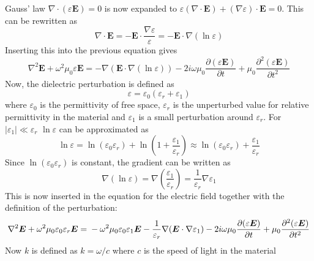 \documentclass[10pt,a4paper]{eitExjobb}
\begin{document}
	Gauss' law $\nabla \cdot (\varepsilon \bm{E}) = 0$ is now expanded to $\varepsilon(\nabla \cdot \bm{E}) + (\nabla \varepsilon) \cdot \bm{E} = 0$. This can be rewritten as
	\begin{equation*}
	\nabla \cdot \bm{E} = -\bm{E} \cdot \frac{\nabla \varepsilon}{\varepsilon} = -\bm{E} \cdot \nabla (\ln{\varepsilon})
	\end{equation*}
	Inserting this into the previous equation gives
	\begin{equation*}
	\nabla^2\bm{E} + \omega^2 \mu_0 \varepsilon \bm{E} = -\nabla(\bm{E} \cdot \nabla (\ln{\varepsilon})) - 2i\omega \mu_0 \frac{\partial (\varepsilon \bm{E})}{\partial t} + \mu_0 \frac{\partial^2 (\varepsilon \bm{E})}{\partial t^2}
	\end{equation*}
	Now, the dielectric perturbation is defined as
	\begin{equation*}
	\varepsilon = \varepsilon_0(\varepsilon_r + \varepsilon_1)
	\end{equation*}
	where $\varepsilon_0$ is the permittivity of free space, $\varepsilon_r$ is the unperturbed value for relative permittivity in the material and $\varepsilon_1$ is a small perturbation around $\varepsilon_r$. For $|\varepsilon_1| \ll \varepsilon_r$ $\ln{\varepsilon}$ can be approximated as
	\begin{equation*}
	\ln{\varepsilon} = \ln(\varepsilon_0 \varepsilon_r) + \ln(1 + \frac{\varepsilon_1}{\varepsilon_r}) \approx \ln(\varepsilon_0 \varepsilon_r) + \frac{\varepsilon_1}{\varepsilon_r}
	\end{equation*}
	Since $\ln(\varepsilon_0 \varepsilon_r)$ is constant, the gradient can be written as
	\begin{equation*}
	\nabla(\ln{\varepsilon}) = \nabla \left( \frac{\varepsilon_1}{\varepsilon_r} \right) = \frac{1}{\varepsilon_r} \nabla \varepsilon_1
	\end{equation*}
	This is now inserted in the equation for the electric field together with the definition of the perturbation:
	\begin{equation*}
	\nabla^2\bm{E} + \omega^2 \mu_0 \varepsilon_0 \varepsilon_r \bm{E} = \\
	-\omega^2 \mu_0 \varepsilon_0 \varepsilon_1 \bm{E} -\frac{1}{\varepsilon_r}\nabla(\bm{E} \cdot \nabla \varepsilon_1) - 2i\omega \mu_0 \frac{\partial (\varepsilon \bm{E})}{\partial t} + \mu_0 \frac{\partial^2 (\varepsilon \bm{E})}{\partial t^2}
	\end{equation*}
	Now $k$ is defined as $k = \omega/c$ where $c$ is the speed of light in the material
\end{document}
